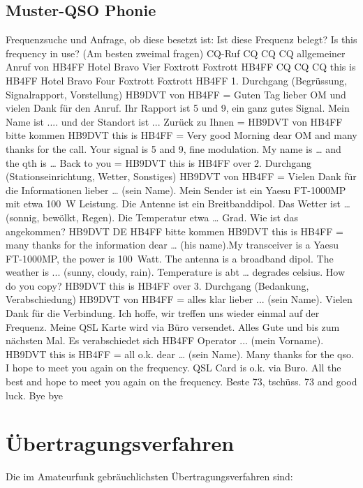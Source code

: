 \subsection{Muster-QSO Phonie}
Frequenzsuche und Anfrage, ob diese besetzt ist:
Ist diese Frequenz belegt?
Is this frequency in use?  (Am besten zweimal fragen)
CQ-Ruf
CQ CQ CQ allgemeiner Anruf von HB4FF Hotel Bravo Vier Foxtrott Foxtrott HB4FF
CQ CQ CQ this is  HB4FF Hotel Bravo Four Foxtrott Foxtrott HB4FF
1. Durchgang (Begrüssung, Signalrapport, Vorstellung)
HB9DVT von HB4FF = Guten Tag lieber OM und vielen Dank für den Anruf. 
Ihr Rapport ist 5 und 9, ein ganz gutes Signal. Mein Name ist ....  und der Standort ist ... 
Zurück zu Ihnen = HB9DVT von HB4FF bitte kommen
HB9DVT this is HB4FF = Very good Morning dear OM and many thanks for the call. 
Your signal is 5 and 9, fine modulation. My name is … and the qth is …
Back to you = HB9DVT this is HB4FF over
2. Durchgang (Stationseinrichtung, Wetter, Sonstiges)
HB9DVT von HB4FF = Vielen Dank für die Informationen lieber … (sein Name). Mein Sender ist ein Yaesu FT-1000MP mit etwa 100 W Leistung. Die Antenne ist ein Breitbanddipol. 
Das Wetter ist … (sonnig, bewölkt, Regen). Die Temperatur etwa … Grad. Wie ist das angekommen? HB9DVT DE HB4FF bitte kommen
HB9DVT this is HB4FF = many thanks for the information dear … (his name).My transceiver is a Yaesu FT-1000MP, the power is 100 Watt. The antenna is a broadband dipol. The weather is ... (sunny, cloudy, rain). Temperature is abt … degrades celsius. How do you copy? HB9DVT this is HB4FF over
3. Durchgang (Bedankung, Verabschiedung)
HB9DVT von HB4FF = alles klar lieber ... (sein Name). Vielen Dank für die Verbindung. 
Ich hoffe, wir treffen uns wieder einmal auf der Frequenz. Meine QSL Karte wird via Büro versendet. 
Alles Gute und bis zum nächsten Mal. Es verabschiedet sich HB4FF Operator ... (mein Vorname).
HB9DVT this is HB4FF = all o.k. dear … (sein Name). Many thanks for the qso. 
I hope to meet you again on the frequency. QSL Card is o.k. via Buro.
All the best and hope to meet you again on the frequency. 
Beste 73, tschüss.
73 and good luck. Bye bye 

\section{Übertragungsverfahren}
Die im Amateurfunk gebräuchlichsten Übertragungsverfahren sind:


